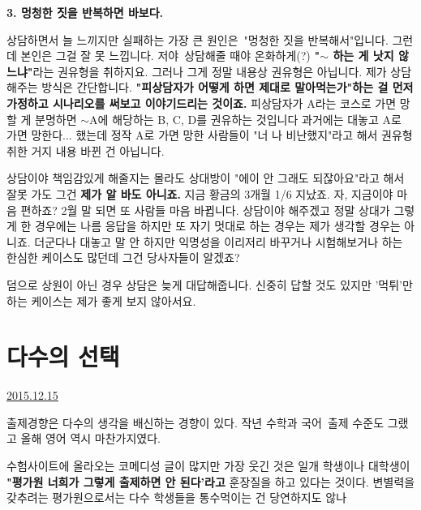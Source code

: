 \item \textbf{3. 멍청한 짓을 반복하면 바보다.}
\vspace{5mm}

상담하면서 늘 느끼지만 실패하는 가장 큰 원인은 "멍청한 짓을 반복해서"입니다.
그런데 본인은 그걸 잘 못 느낍니다.
저야 상담해줄 때야 온화하게(?) \textbf{"$\sim$ 하는 게 낫지 않느냐"}라는 권유형을 취하지요.
그러나 그게 정말 내용상 권유형은 아닙니다. 제가 상담해주는 방식은 간단합니다.
\textbf{"피상담자가 어떻게 하면 제대로 말아먹는가"하는 걸 먼저 가정하고 시나리오를 써보고 이야기드리는 것이죠.}
피상담자가 A라는 코스로 가면 망할 게 분명하면 $\sim$A에 해당하는 B, C, D를 권유하는 것입니다
과거에는 대놓고 A로 가면 망한다... 했는데 정작 A로 가면 망한 사람들이 "너 나 비난했지"라고 해서 권유형 취한 거지 내용 바뀐 건 아닙니다.
\vspace{5mm}

상담이야 책임감있게 해줄지는 몰라도 상대방이 "에이 안 그래도 되잖아요"라고 해서 잘못 가도 그건 \textbf{제가 알 바도 아니죠.}
지금 황금의 3개월 1/6 지났죠. 자, 지금이야 마음 편하죠? 2월 말 되면 또 사람들 마음 바뀝니다.
상담이야 해주겠고 정말 상대가 그렇게 한 경우에는 나름 응답을 하지만 또 자기 멋대로 하는 경우는 제가 생각할 경우는 아니죠.
더군다나 대놓고 말 안 하지만 익명성을 이리저리 바꾸거나 시험해보거나 하는 한심한 케이스도 많던데 그건 당사자들이 알겠죠?
\vspace{5mm}

덤으로 상원이 아닌 경우 상담은 늦게 대답해줍니다.
신중히 답할 것도 있지만 '먹튀'만 하는 케이스는 제가 좋게 보지 않아서요.
\vspace{5mm}






\section{다수의 선택}
\href{https://www.kockoc.com/Apoc/545560}{2015.12.15}

\vspace{5mm}

출제경향은 다수의 생각을 배신하는 경향이 있다.
작년 수학과 국어 출제 수준도 그랬고 올해 영어 역시 마찬가지였다.
\vspace{5mm}

수험사이트에 올라오는 코메디성 글이 많지만 가장 웃긴 것은
일개 학생이나 대학생이 \textbf{"평가원 너희가 그렇게 출제하면 안 된다'라고} 훈장질을 하고 있다는 것이다.
변별력을 갖추려는 평가원으로서는 다수 학생들을 통수먹이는 건 당연하지도 않나
\vspace{5mm}

